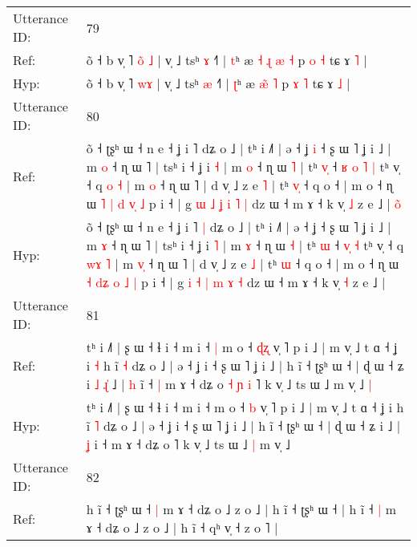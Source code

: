 \documentclass[10pt]{article}
\DeclareRobustCommand{\hl}[1]{{\textcolor{red}{#1}}}
\begin{document}
\begin{longtable}{ll}
\midrule
Utterance ID: & 79 \\
Ref: & õ ˧ b v̩ ˥ \hl{o}\hl{̃}\hl{ }\hl{˩} | v̩ ˩ tsʰ \hl{ɤ} ˧˥ | \hl{t}ʰ æ\hl{ }\hl{˧} \hl{ɻ}\hl{ }\hl{æ} \hl{˧} p \hl{o} \hl{˧} tɕ ɤ \hl{˥} |
 \\
Hyp: & õ ˧ b v̩ ˥ \hl{}\hl{}\hl{w}\hl{ɤ} | v̩ ˩ tsʰ \hl{æ} ˧˥ | \hl{ʈ}ʰ æ\hl{}\hl{} \hl{}\hl{æ}\hl{̃} \hl{˥} p \hl{ɤ} \hl{˥} tɕ ɤ \hl{˩} |
 \\
\midrule
Utterance ID: & 80 \\
Ref: & õ ˧ ʈʂʰ ɯ ˧ n e ˧ ʝ i ˥\hl{}\hl{} dʑ o ˩ | tʰ i ˩˥ | ə ˧ ʝ\hl{ }\hl{i} ˧ ʂ ɯ ˥ ʝ i ˩ | m \hl{o} ˧ ɳ ɯ ˥ | tsʰ i ˧ ʝ i \hl{˧} | m \hl{o} ˧ ɳ ɯ \hl{˥} | tʰ \hl{v}\hl{̩} ˧\hl{ }\hl{ʁ} \hl{o}\hl{ }\hl{˥} \hl{|} tʰ v̩ ˧ q \hl{}\hl{o} \hl{˧} | m \hl{}\hl{o} ˧ ɳ ɯ ˥ | d v̩ ˩ z e \hl{˥} | tʰ \hl{v}\hl{̩} ˧ q o ˧ | m o ˧ ɳ ɯ \hl{˥} \hl{}\hl{|} \hl{d} \hl{v}\hl{̩} \hl{˩} p i ˧ | g \hl{ɯ} \hl{˩} \hl{ʝ} \hl{i} \hl{˥} \hl{|} dz ɯ ˧ m ɤ ˧ k v̩ \hl{˩} z e ˩ |\hl{ }\hl{o}\hl{̃}
 \\
Hyp: & õ ˧ ʈʂʰ ɯ ˧ n e ˧ ʝ i ˥\hl{ }\hl{|} dʑ o ˩ | tʰ i ˩˥ | ə ˧ ʝ\hl{}\hl{} ˧ ʂ ɯ ˥ ʝ i ˩ | m \hl{ɤ} ˧ ɳ ɯ ˥ | tsʰ i ˧ ʝ i \hl{˥} | m \hl{ɤ} ˧ ɳ ɯ \hl{˧} | tʰ \hl{}\hl{ɯ} ˧\hl{}\hl{} \hl{}\hl{v}\hl{̩} \hl{˧} tʰ v̩ ˧ q \hl{w}\hl{ɤ} \hl{˥} | m \hl{v}\hl{̩} ˧ ɳ ɯ ˥ | d v̩ ˩ z e \hl{˩} | tʰ \hl{}\hl{ɯ} ˧ q o ˧ | m o ˧ ɳ ɯ \hl{˧} \hl{d}\hl{ʑ} \hl{o} \hl{}\hl{˩} \hl{|} p i ˧ | g \hl{i} \hl{˧} \hl{|} \hl{m} \hl{ɤ} \hl{˧} dz ɯ ˧ m ɤ ˧ k v̩ \hl{˧} z e ˩ |\hl{}\hl{}\hl{}
 \\
\midrule
Utterance ID: & 81 \\
Ref: & tʰ i ˩˥ | ʂ ɯ ˧ ɬ i ˧ m i ˧\hl{ }\hl{|} m o ˧ \hl{ɖ}\hl{ʐ} v̩ ˥ p i ˩ | m v̩ ˩ t ɑ ˧ ʝ i\hl{ }\hl{˧} h ĩ \hl{˧} dʑ o ˩ | ə ˧ ʝ i ˧ ʂ ɯ ˥ ʝ i ˩ | h ĩ ˧ ʈʂʰ ɯ ˧ | ɖ ɯ ˧ ʑ i\hl{ }\hl{˩}\hl{ }\hl{ɻ}\hl{̍} ˩ | \hl{h} i\hl{̃} ˧\hl{ }\hl{|} m ɤ ˧ dʑ o\hl{ }\hl{˧}\hl{ }\hl{ɲ}\hl{ }\hl{i} ˥ k v̩ ˩ ts ɯ ˩\hl{}\hl{} m v̩ ˩\hl{ }\hl{|}
 \\
Hyp: & tʰ i ˩˥ | ʂ ɯ ˧ ɬ i ˧ m i ˧\hl{}\hl{} m o ˧ \hl{}\hl{b} v̩ ˥ p i ˩ | m v̩ ˩ t ɑ ˧ ʝ i\hl{}\hl{} h ĩ \hl{˥} dʑ o ˩ | ə ˧ ʝ i ˧ ʂ ɯ ˥ ʝ i ˩ | h ĩ ˧ ʈʂʰ ɯ ˧ | ɖ ɯ ˧ ʑ i\hl{}\hl{}\hl{}\hl{}\hl{} ˩ | \hl{ʝ} i\hl{} ˧\hl{}\hl{} m ɤ ˧ dʑ o\hl{}\hl{}\hl{}\hl{}\hl{}\hl{} ˥ k v̩ ˩ ts ɯ ˩\hl{ }\hl{|} m v̩ ˩\hl{}\hl{}
 \\
\midrule
Utterance ID: & 82 \\
Ref: & h ĩ ˧ ʈʂʰ ɯ ˧\hl{ }\hl{|} m ɤ ˧ dʑ o ˩ z o ˩ |\hl{}\hl{}\hl{}\hl{} h ĩ ˧ ʈʂʰ ɯ ˧ | h ĩ ˧\hl{ }\hl{|} m ɤ ˧ dʑ o ˩ z o ˩ | h ĩ ˧ qʰ v̩ ˧ z o ˥ |
 \\

\end{longtable}
\end{document}
